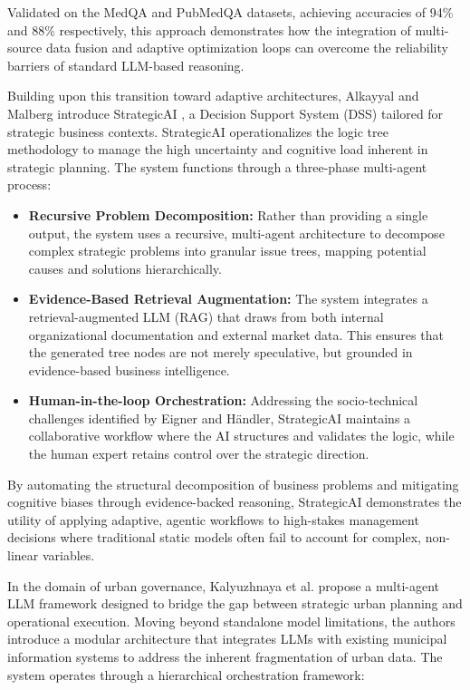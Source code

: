 Validated on the MedQA and PubMedQA datasets, achieving accuracies of 94\% and 88\% respectively, this approach demonstrates how the integration of multi-source data fusion and adaptive optimization loops can overcome the reliability barriers of standard LLM-based reasoning.




Building upon this transition toward adaptive architectures, Alkayyal and Malberg introduce StrategicAI \cite{alkayyal2025llm}, a Decision Support System (DSS) tailored for strategic business contexts. StrategicAI operationalizes the logic tree methodology to manage the high uncertainty and cognitive load inherent in strategic planning. The system functions through a three-phase multi-agent process:

\begin{itemize}
\item \textbf{Recursive Problem Decomposition:} Rather than providing a single output, the system uses a recursive, multi-agent architecture to decompose complex strategic problems into granular issue trees, mapping potential causes and solutions hierarchically.
\item \textbf{Evidence-Based Retrieval Augmentation:} The system integrates a retrieval-augmented LLM (RAG) that draws from both internal organizational documentation and external market data. This ensures that the generated tree nodes are not merely speculative, but grounded in evidence-based business intelligence.
\item \textbf{Human-in-the-loop Orchestration:} Addressing the socio-technical challenges identified by Eigner and Händler, StrategicAI maintains a collaborative workflow where the AI structures and validates the logic, while the human expert retains control over the strategic direction.
\end{itemize}

By automating the structural decomposition of business problems and mitigating cognitive biases through evidence-backed reasoning, StrategicAI demonstrates the utility of applying adaptive, agentic workflows to high-stakes management decisions where traditional static models often fail to account for complex, non-linear variables.



In the domain of urban governance, Kalyuzhnaya et al. \cite{smartcities8010019} propose a multi-agent LLM framework designed to bridge the gap between strategic urban planning and operational execution. Moving beyond standalone model limitations, the authors introduce a modular architecture that integrates LLMs with existing municipal information systems to address the inherent fragmentation of urban data. The system operates through a hierarchical orchestration framework:

